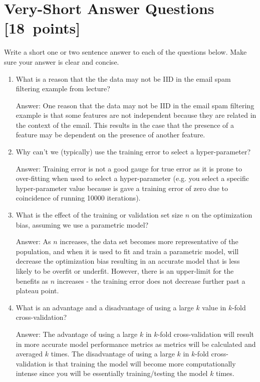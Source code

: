 \documentclass{article}
\newcommand{\blu}[1]{{\textcolor{blu}{#1}}}
\newcommand{\gre}[1]{\textcolor{gre}{#1}}
\newcommand\ans[1]{\par\gre{Answer: #1}}
\let\ask\blu
\newcommand\pts[1]{\textcolor{pointscolour}{[#1~points]}}
\begin{document}
    \clearpage
    \section{Very-Short Answer Questions \pts{18}}

    \ask{Write a short one or two sentence answer to each of the questions below}. Make sure your answer is clear and concise.

    \begin{enumerate}
        \item What is a reason that the the data may not be IID in the email spam filtering example from lecture?

        \ans{One reason that the data may not be IID in the email spam filtering example is that some features are not independent because they are related in the context of the email. This results in the case that the presence of a feature may be dependent on the presence of another feature.}
        
        \item Why can't we (typically) use the training error to select a hyper-parameter?

        \ans{Training error is not a good gauge for true error as it is prone to over-fitting when used to select a hyper-parameter (e.g. you select a specific hyper-parameter value because is gave a training error of zero due to coincidence of running 10000 iterations).}
        

        \item What is the effect of the training or validation set size $n$ on the optimization bias, assuming we use a parametric model?

        \ans{ As $n$ increases, the data set becomes more representative of the population, and when it is used to fit and train a parametric model, will decrease the optimization bias resulting in an accurate model that is less likely to be overfit or underfit. However, there is an upper-limit for the benefits as $n$ increases - the training error does not decrease further past a plateau point.}

        \item What is an advantage and a disadvantage of using a large $k$ value in $k$-fold cross-validation?

        \ans{ \newline The advantage of using a large $k$ in $k$-fold cross-validation will result in more accurate model performance metrics as metrics will be calculated and averaged $k$ times. \newline \newline The disadvantage of using a large $k$ in $k$-fold cross-validation is that training the model will become more computationally intense since you will be essentially training/testing the model $k$ times. }


\end{enumerate}
\end{document}
